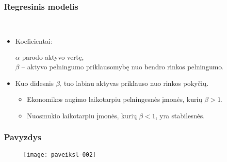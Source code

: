\documentclass[utf8,hyperref={unicode},xcolor=dvipsnames]{beamer}
\theoremstyle{change}\newtheorem{teorema}{Teiginys}
\theoremstyle{change}\newtheorem{salyga}{}
\begin{document}
\begin{frame}
    \frametitle{Regresinis modelis} 
  \\


    \begin{itemize}
	
	\item Koeficientai: 

$ \alpha $ parodo aktyvo vertę,\\ 

$ \beta $ -- aktyvo pelningumo priklausomybę nuo bendro rinkos pelningumo.
\bigskip
\item Kuo didesnis $ \beta $, tuo labiau aktyvas priklauso nuo rinkos pokyčių.
\bigskip
\begin{itemize}
\item Ekonomikos augimo laikotarpiu pelningesnės įmonės, kurių $\beta>1$.

\item Nuosmukio laikotarpiu įmonės, kurių $\beta<1$, yra stabilesnės.

\end{itemize}




    \end{itemize}
\end{frame}

\begin{frame}
\frametitle{Pavyzdys}
\begin{figure}
\centering
\texttt{[image: paveiksl-002]}

\end{figure}


\end{frame}
\end{document}
